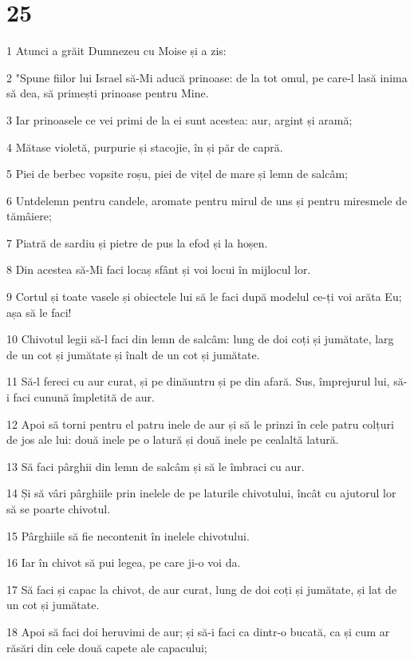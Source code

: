 \chapter{25}

\par 1 Atunci a grăit Dumnezeu cu Moise și a zis:
\par 2 "Spune fiilor lui Israel să-Mi aducă prinoase: de la tot omul, pe care-l lasă inima să dea, să primești prinoase pentru Mine.
\par 3 Iar prinoasele ce vei primi de la ei sunt acestea: aur, argint și aramă;
\par 4 Mătase violetă, purpurie și stacojie, în și păr de capră.
\par 5 Piei de berbec vopsite roșu, piei de vițel de mare și lemn de salcâm;
\par 6 Untdelemn pentru candele, aromate pentru mirul de uns și pentru miresmele de tămâiere;
\par 7 Piatră de sardiu și pietre de pus la efod și la hoșen.
\par 8 Din acestea să-Mi faci locaș sfânt și voi locui în mijlocul lor.
\par 9 Cortul și toate vasele și obiectele lui să le faci după modelul ce-ți voi arăta Eu; așa să le faci!
\par 10 Chivotul legii să-l faci din lemn de salcâm: lung de doi coți și jumătate, larg de un cot și jumătate și înalt de un cot și jumătate.
\par 11 Să-l fereci cu aur curat, și pe dinăuntru și pe din afară. Sus, împrejurul lui, să-i faci cunună împletită de aur.
\par 12 Apoi să torni pentru el patru inele de aur și să le prinzi în cele patru colțuri de jos ale lui: două inele pe o latură și două inele pe cealaltă latură.
\par 13 Să faci pârghii din lemn de salcâm și să le îmbraci cu aur.
\par 14 Și să vâri pârghiile prin inelele de pe laturile chivotului, încât cu ajutorul lor să se poarte chivotul.
\par 15 Pârghiile să fie necontenit în inelele chivotului.
\par 16 Iar în chivot să pui legea, pe care ji-o voi da.
\par 17 Să faci și capac la chivot, de aur curat, lung de doi coți și jumătate, și lat de un cot și jumătate.
\par 18 Apoi să faci doi heruvimi de aur; și să-i faci ca dintr-o bucată, ca și cum ar răsări din cele două capete ale capacului;
